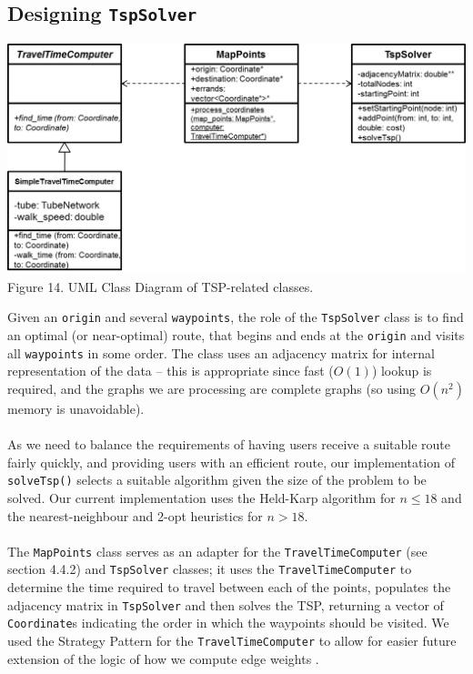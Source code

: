 \documentclass[a4paper, 10pt]{report}
\begin{document}
\subsection{Designing \texttt{TspSolver}}
\begin{center}
\includegraphics[scale=0.6]{uml_tsp.png}\\
Figure 14. UML Class Diagram of TSP-related classes.
\end{center}
Given an \texttt{origin} and several \texttt{waypoints}, the role of the \texttt{TspSolver} class is to find an optimal (or near-optimal) route, that begins and ends at the \texttt{origin} and visits all \texttt{waypoints} in some order. The class uses an adjacency matrix for internal representation of the data -- this is appropriate since fast ($O(1)$) lookup is required, and the graphs we are processing are complete graphs (so using $O(n^2)$ memory is unavoidable). \\\\
As we need to balance the requirements of having users receive a suitable route fairly quickly, and providing users with an efficient route, our implementation of \texttt{solveTsp()} selects a suitable algorithm given the size of the problem to be solved. Our current implementation uses the Held-Karp algorithm for $n \leq 18$ and the nearest-neighbour and 2-opt heuristics for $n > 18$.\\\\
The \texttt{MapPoints} class serves as an adapter for the \texttt{TravelTimeComputer} (see section 4.4.2) and \texttt{TspSolver} classes; it uses the \texttt{TravelTimeComputer} to determine the time required to travel between each of the points, populates the adjacency matrix in \texttt{TspSolver} and then solves the TSP, returning a vector of \texttt{Coordinate}s indicating the order in which the waypoints should be visited. We used the Strategy Pattern for the \texttt{TravelTimeComputer} to allow for easier future extension of the logic of how we compute edge weights \cite{strategy-pattern}.
\end{document}
